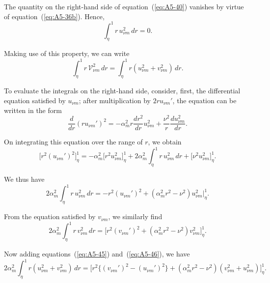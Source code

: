 The quantity on the right-hand side of equation~(\ref{eq:A5-40}) vanishes by virtue
of equation~(\ref{eq:A5-36b}). Hence,
\begin{equation}
\label{eq:A5-41}
\int_\eta^1 r \, u_{\nu m}^2 \, dr = 0.
\end{equation}

Making use of this property, we can write
\begin{equation}
\label{eq:A5-42}
\int_\eta^1 r \, \mathscr{V}_{\nu m}^2 \, dr = \int_\eta^1 r(u_{\nu m}^2 + v_{\nu m}^2) \, dr.
\end{equation}

To evaluate the integrals on the right-hand side, consider, first, the
differential equation satisfied by $u_{\nu m}$; after multiplication by $2r u_{\nu m}'$, the
equation can be written in the form
\begin{equation}
\label{eq:A5-43}
\frac{d}{dr}(r u_{\nu m}')^2 = -\alpha_m^2 r \frac{d r^2}{dr} u_{\nu m}^2 + \frac{\nu^2}{r}\frac{du_{\nu m}^2}{dr}.
\end{equation}

On integrating this equation over the range of $r$, we obtain
\begin{equation}
\label{eq:A5-44}
\bigl[r^2(u_{\nu m}')^2\bigr]_\eta^1 = -\alpha_m^2 \bigl[r^2 u_{\nu m}^2\bigr]_\eta^1 + 2\alpha_m^2 \int_\eta^1 r \, u_{\nu m}^2 \, dr + \bigl[\nu^2 u_{\nu m}^2\bigr]_\eta^1.
\end{equation}

We thus have
\begin{equation}
\label{eq:A5-45}
2\alpha_m^2 \int_\eta^1 r \, u_{\nu m}^2 \, dr = -r^2(u_{\nu m}')^2 + (\alpha_m^2 r^2 - \nu^2) u_{\nu m}^2 \Big|_\eta^1.
\end{equation}

From the equation satisfied by $v_{\nu m}$, we similarly find
\begin{equation}
\label{eq:A5-46}
2\alpha_m^2 \int_\eta^1 r \, v_{\nu m}^2 \, dr = \bigl[r^2(v_{\nu m}')^2 + (\alpha_m^2 r^2 - \nu^2) v_{\nu m}^2\bigr]_\eta^1.
\end{equation}

Now adding equations~(\ref{eq:A5-45}) and~(\ref{eq:A5-46}), we have
\begin{equation}
\label{eq:A5-47}
2\alpha_m^2 \int_\eta^1 r (u_{\nu m}^2 + v_{\nu m}^2) \, dr = \bigl[r^2\{(v_{\nu m}')^2 - (u_{\nu m}')^2\} +
(\alpha_m^2 r^2 - \nu^2)(v_{\nu m}^2 + u_{\nu m}^2)\bigr]_\eta^1.
\end{equation}


